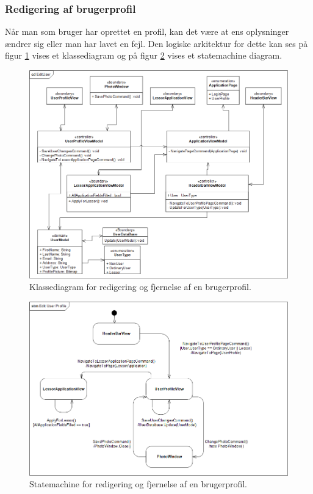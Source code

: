 \documentclass[Arkitektur/System_main.tex]{subfiles}
\begin{document}
\subsubsection{Redigering af brugerprofil}
Når man som bruger har oprettet en profil, kan det være at ens oplysninger ændrer sig eller man har lavet en fejl. Den logiske arkitektur for dette kan ses på figur \ref{fig:EditUserCD} vises et klassediagram og på figur \ref{fig:EditUserSTM} vises et statemachine diagram.
\begin{figure}[H]
    \centering
    \includegraphics[width=1\textwidth]{Arkitektur/Softwarearkitektur/Edit_user_profile/graphics/EditUserCD.png}
    \caption{Klassediagram for redigering og fjernelse af en brugerprofil. }
    \label{fig:EditUserCD}
\end{figure}

\begin{figure}[H]
    \centering
    \includegraphics[width=1\textwidth]{Arkitektur/Softwarearkitektur/Edit_user_profile/graphics/EditUserSTM.png}
    \caption{Statemachine for redigering og fjernelse af en brugerprofil. }
    \label{fig:EditUserSTM}
\end{figure}
\end{document}
